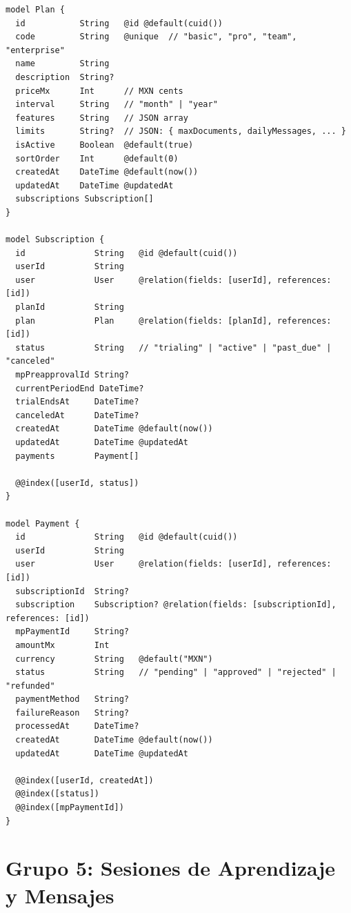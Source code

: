 \begin{lstlisting}[style=sql,caption={Modelos de planes, suscripciones y pagos}]
model Plan {
  id           String   @id @default(cuid())
  code         String   @unique  // "basic", "pro", "team", "enterprise"
  name         String
  description  String?
  priceMx      Int      // MXN cents
  interval     String   // "month" | "year"
  features     String   // JSON array
  limits       String?  // JSON: { maxDocuments, dailyMessages, ... }
  isActive     Boolean  @default(true)
  sortOrder    Int      @default(0)
  createdAt    DateTime @default(now())
  updatedAt    DateTime @updatedAt
  subscriptions Subscription[]
}

model Subscription {
  id              String   @id @default(cuid())
  userId          String
  user            User     @relation(fields: [userId], references: [id])
  planId          String
  plan            Plan     @relation(fields: [planId], references: [id])
  status          String   // "trialing" | "active" | "past_due" | "canceled"
  mpPreapprovalId String?
  currentPeriodEnd DateTime?
  trialEndsAt     DateTime?
  canceledAt      DateTime?
  createdAt       DateTime @default(now())
  updatedAt       DateTime @updatedAt
  payments        Payment[]

  @@index([userId, status])
}

model Payment {
  id              String   @id @default(cuid())
  userId          String
  user            User     @relation(fields: [userId], references: [id])
  subscriptionId  String?
  subscription    Subscription? @relation(fields: [subscriptionId], references: [id])
  mpPaymentId     String?
  amountMx        Int
  currency        String   @default("MXN")
  status          String   // "pending" | "approved" | "rejected" | "refunded"
  paymentMethod   String?
  failureReason   String?
  processedAt     DateTime?
  createdAt       DateTime @default(now())
  updatedAt       DateTime @updatedAt

  @@index([userId, createdAt])
  @@index([status])
  @@index([mpPaymentId])
}
\end{lstlisting}

\section{Grupo 5: Sesiones de Aprendizaje y Mensajes}


